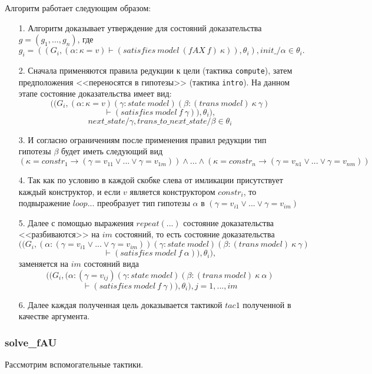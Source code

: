 \documentclass[12pt]{article}
\begin{document}
Алгоритм работает следующим образом:
\begin{enumerate}
    \item[1.] Алгоритм доказывает утверждение для состояний доказательства $g = (g_1, ..., g_n)$, где 
    $$g_i = ((G_i, (\alpha: \kappa = v) \vdash (satisfies\ model\ (fAX\ f)\ \kappa)), \theta_i), init\_/\alpha \in \theta_i.$$
    \item[2.] Сначала применяются правила редукции к цели (тактика \verb|compute|), затем предположения <<переносятся в гипотезы>> (тактика \verb|intro|). На данном этапе состояние доказательства имеет вид:
    $$((G_i, (\alpha: \kappa = v) (\gamma: state\ model) (\beta: (trans\  model)\ \kappa\ \gamma) $$
    $$\vdash (satisfies\ model\ f\ \gamma)), \theta_i),$$
    $$next\_state/\gamma, trans\_to\_next\_state/\beta \in \theta_i$$
    \item[3.] И согласно ограничениям после применения правил редукции тип гипотезы $\beta$ будет иметь следующий вид
    $$(\kappa = constr_1 \xrightarrow{} (\gamma=v_{11} \vee ... \vee \gamma=v_{1m})) \wedge ... \wedge (\kappa = constr_n \xrightarrow{} (\gamma=v_{n1} \vee ... \vee \gamma=v_{nm}))$$
    \item[4.] Так как по условию в каждой скобке слева от имликации присутствует каждый конструктор, и если $v$ является конструктором $constr_i$, то подвыражение $loop...$ преобразует тип гипотезы $\alpha$ в 
    $(\gamma=v_{i1} \vee ... \vee \gamma=v_{im})$
    \item[5.] Далее с помощью выражения $repeat(...)$ состояние доказательства <<разбиваются>> на $im$ состояний, то есть состояние доказательства
    $$((G_i, (\alpha: (\gamma=v_{i1} \vee ... \vee \gamma=v_{im})) (\gamma: state\ model) (\beta: (trans\  model)\ \kappa\ \gamma ) $$
    $$\vdash (satisfies\ model\ f\ \alpha)), \theta_i),$$ заменяется на $im$ состояний вида
    $$((G_i, (\alpha: (\gamma=v_{ij}) (\gamma: state\ model) (\beta: (trans\  model)\ \kappa\ \alpha ) $$
    $$\vdash (satisfies\ model\ f\ \gamma)), \theta_i), j=1,...,im$$
    \item[6.] Далее каждая полученная цель доказывается тактикой $tac1$ полученной в качестве аргумента.
\end{enumerate}



\subsubsection{solve\_fAU}
Рассмотрим вспомогательные тактики.
\end{document}
